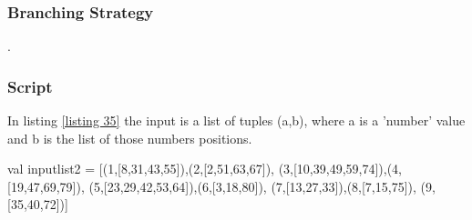 \documentclass[a4paper,halfparskip]{scrartcl}
\begin{document}
\subsubsection{Branching Strategy}
.

\subsubsection{Script}
In listing \ref{listing 35} the input is a list of tuples
(a,b), where a is a 'number' value and b is the list of those
numbers positions. 
\begin{myverbatim}
val inputlist2 = [(1,[8,31,43,55]),(2,[2,51,63,67]),
                  (3,[10,39,49,59,74]),(4,[19,47,69,79]),
                  (5,[23,29,42,53,64]),(6,[3,18,80]),
                  (7,[13,27,33]),(8,[7,15,75]),
                  (9,[35,40,72])]


\end{myverbatim}
\end{document}
